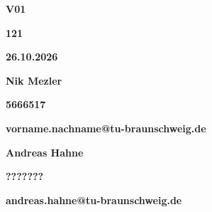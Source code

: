 \documentclass[12pt, a4paper, DIV=12, BCOR=1cm]{scrartcl}
\begin{document}
	\thispagestyle{empty}
	\vspace*{3.1cm}
	\hspace*{0.9cm}
	\begin{minipage}{2cm}
			{\color{white} \fontsize{48}{40} \selectfont \textbf{V01}} %
	\end{minipage}

	\vspace{8.45cm}
	\hspace*{7cm}
	\begin{minipage}{2cm}
	{\color{white}  \Large \textbf{121}} %
	\end{minipage}
	\hspace*{7cm}
	\begin{minipage}{4cm}
	{\color{white}  \Large \textbf{26.10.2026}} %
    \end{minipage}
    
	\vspace{1.65cm}
	\hspace*{3cm}
	\begin{minipage}{8cm}
	{\color{white}  \Large \textbf{Nik Mezler}} %
	\end{minipage}
	\hspace*{3.3cm}
	\begin{minipage}{3cm}
	{\color{white}  \Large \textbf{5666517}} %
	\end{minipage}
	
	\vspace{1.3cm}
	\hspace*{5.75cm}
	\begin{minipage}{14cm}
	{\color{white}  \Large \textbf{vorname.nachname@tu-braunschweig.de}} %
	\end{minipage}
	
	\vspace{1.65cm}
	\hspace*{3cm}
	\begin{minipage}{8cm}
	{\color{white}  \Large \textbf{Andreas Hahne}} %
	\end{minipage}
	\hspace*{3.3cm}
	\begin{minipage}{3cm}
	{\color{white}  \Large \textbf{???????}} %
	\end{minipage}

	\vspace{1.3cm}
	\hspace*{5.75cm}
	\begin{minipage}{14cm}
	{\color{white}  \Large \textbf{andreas.hahne@tu-braunschweig.de}} %
	\end{minipage}
	
\end{document}

